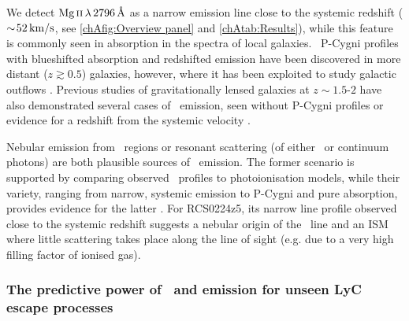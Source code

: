 We detect $\MgII \, \lambda \, 2796 \, \Angstrom$ as a narrow emission line close to the systemic redshift ($\sim \! 52 \, \mathrm{km/s}$, see \cref{chAfig:Overview panel} and \cref{chAtab:Results}), while this feature is commonly seen in absorption in the spectra of local galaxies. \MgII\ P-Cygni profiles with blueshifted absorption and redshifted emission have been discovered in more distant ($z \gtrsim 0.5$) galaxies, however, where it has been exploited to study galactic outflows \citep[e.g.][]{2009ApJ...692..187W, 2010ApJ...719.1503R, 2011ApJ...728...55R, 2011ApJ...743...95G, 2012ApJ...759...26E, 2013ApJ...774...50K, 2016MNRAS.458.1891B, 2017A&A...608A...7F}. Previous studies of gravitationally lensed galaxies at $z \sim 1.5$-$2$ have also demonstrated several cases of \MgII\ emission, seen without P-Cygni profiles or evidence for a redshift from the systemic velocity \citep{2010MNRAS.402.2335P, 2014ApJ...790...44R, 2016A&A...585A..27K}.

Nebular emission from \HII\ regions or resonant scattering (of either \MgII\ or continuum photons) are both plausible sources of \MgII\ emission. The former scenario is supported by comparing observed \MgII\ profiles to photoionisation models, while their variety, ranging from narrow, systemic emission to P-Cygni and pure absorption, provides evidence for the latter \citep{2010ApJ...719.1503R, 2012ApJ...759...26E, 2018A&A...617A..62F}. For RCS0224z5, its narrow line profile observed close to the systemic redshift suggests a nebular origin of the \MgII\ line and an ISM where little scattering takes place along the line of sight (e.g. due to a very high filling factor of ionised gas).

\subsubsection{The predictive power of \texorpdfstring{\lya\ and \MgII}{\lyatext and Mg II} emission for unseen LyC escape processes}
\label{chAsssec:Lya and MgII tracing LyC escape}

